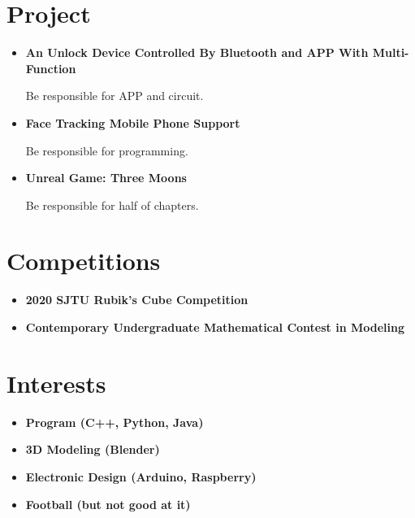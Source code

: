 \documentclass{article}
\begin{document}
\section*{Project}
\begin{itemize}
    \item {\bf An Unlock Device Controlled By Bluetooth and APP With Multi-Function} \\
        \rule{0mm}{5mm}Be responsible for APP and circuit.
    \item {\bf Face Tracking Mobile Phone Support} \\
        \rule{0mm}{5mm}Be responsible for programming.
    \item {\bf Unreal Game: Three Moons} \\
        \rule{0mm}{5mm}Be responsible for half of chapters.
\end{itemize}


\section*{Competitions}
\begin{itemize}
    \item {\bf 2020 SJTU Rubik's Cube Competition}
    \item {\bf Contemporary Undergraduate Mathematical Contest in Modeling}
\end{itemize}


\section*{Interests}
\begin{itemize}
    \item {\bf Program (C++, Python, Java)}
    \item {\bf 3D Modeling (Blender)}
    \item {\bf Electronic Design (Arduino, Raspberry)}
    \item {\bf Football (but not good at it)}
\end{itemize}
\end{document}
